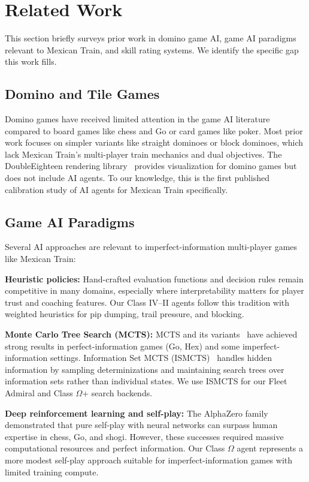 \documentclass[11pt,letterpaper]{article}
\begin{document}
\section{Related Work}

This section briefly surveys prior work in domino game AI, game AI paradigms relevant to Mexican Train, and skill rating systems. We identify the specific gap this work fills.

\subsection{Domino and Tile Games}

Domino games have received limited attention in the game AI literature compared to board games like chess and Go or card games like poker. Most prior work focuses on simpler variants like straight dominoes or block dominoes, which lack Mexican Train's multi-player train mechanics and dual objectives. The DoubleEighteen rendering library~\cite{doubleighteen2024} provides visualization for domino games but does not include AI agents. To our knowledge, this is the first published calibration study of AI agents for Mexican Train specifically.

\subsection{Game AI Paradigms}

Several AI approaches are relevant to imperfect-information multi-player games like Mexican Train:

\textbf{Heuristic policies:} Hand-crafted evaluation functions and decision rules remain competitive in many domains, especially where interpretability matters for player trust and coaching features. Our Class IV--II agents follow this tradition with weighted heuristics for pip dumping, trail pressure, and blocking.

\textbf{Monte Carlo Tree Search (MCTS):} MCTS and its variants~\cite{browne2012mcts} have achieved strong results in perfect-information games (Go, Hex) and some imperfect-information settings. Information Set MCTS (ISMCTS)~\cite{cowling2012ismcts} handles hidden information by sampling determinizations and maintaining search trees over information sets rather than individual states. We use ISMCTS for our Fleet Admiral and Class $\Omega$+ search backends.

\textbf{Deep reinforcement learning and self-play:} The AlphaZero family~\cite{silver2017alphazero,silver2018alphazero} demonstrated that pure self-play with neural networks can surpass human expertise in chess, Go, and shogi. However, these successes required massive computational resources and perfect information. Our Class $\Omega$ agent represents a more modest self-play approach suitable for imperfect-information games with limited training compute.
\end{document}
